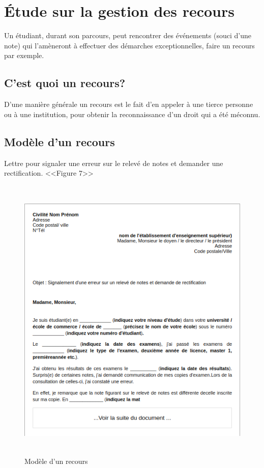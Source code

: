 \documentclass[12pt]{report}
\begin{document}
\newpage

\section{Étude sur la gestion des recours}
\vspace{0.2in}
Un étudiant, durant son parcours, peut rencontrer des événements (souci d’une note) qui l'amèneront à effectuer des démarches exceptionnelles, faire un recours par exemple.

\subsection{C'est quoi un recours?}
D'une manière générale un recours est le fait d'en appeler à une tierce personne ou à une institution, pour obtenir la reconnaissance d'un droit qui a été méconnu.

\subsection{Modèle d’un recours}
\vspace{0.1in}
Lettre pour signaler une erreur sur le relevé de notes et demander une rectification. <<Figure 7>>

\vspace{0.2in}

\begin{figure}[h]
\centering
    \includegraphics[width = 6in, height = 5.5in]{../Images/ModeleRecours.png}
\caption{Modèle d’un recours}
\end{figure}
\end{document}
